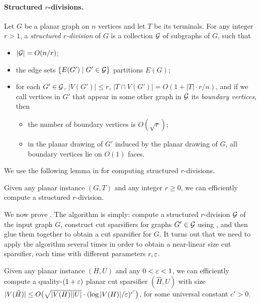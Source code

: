 \paragraph{Structured $r$-divisions.} Let $G$ be a planar graph on $n$ vertices and let $T$ be its terminals. For any integer $r>1$, a \emph{structured $r$-division} of $G$ is a collection ${\mathcal{G}}$ of subgraphs of $G$, such that
\begin{itemize}
\item $|{\mathcal{G}}|=O(n/r)$;
\item the edge sets $\left\{ E(G')\mid G'\in {\mathcal{G}} \right\}$ partitions $E(G)$;
\item for each $G'\in {\mathcal{G}}$, $|V(G')|\le r$, $|T\cap V(G')|=O(1+|T|\cdot r/n)$, and if we call vertices in $G'$ that appear in some other graph in ${\mathcal{G}}$ its \emph{boundary vertices}, then
\begin{itemize}
\item the number of boundary vertices is $O(\sqrt{r})$;
\item in the planar drawing of $G'$ induced by the planar drawing of $G$, all boundary vertices lie on $O(1)$ faces.
\end{itemize}
\end{itemize}

We use the following lemma in \cite{chang2022near} for computing structured $r$-divisions.

\begin{lemma}
\label{lem: r-division}
Given any planar instance $(G,T)$ and any integer $r\ge 0$, we can efficiently compute a structured $r$-division.
\end{lemma}

We now prove . The algorithm is simply: compute a structured $r$-division ${\mathcal{G}}$ of the input graph $G$, construct cut sparsifiers for graphs $G'\in {\mathcal{G}}$ using , and then glue them together to obtain a cut sparsifier for $G$.
It turns out that we need to apply the algorithm several times in order to obtain a near-linear size cut sparsifier, each time with different parameters $r,{\varepsilon}$.

\begin{lemma}
\label{lem: recursive}
Given any planar instance $(H,U)$ and any $0<{\varepsilon}<1$, we can efficiently compute a quality-$(1+{\varepsilon})$ planar cut sparsifier $(\hat H, U)$ with size $|V(\hat H)|\le O\big(\sqrt{|V(H)| |U|}\cdot (\log |V(H)|/{\varepsilon})^{c'}\big)$, for some universal constant $c'>0$.
\end{lemma}

